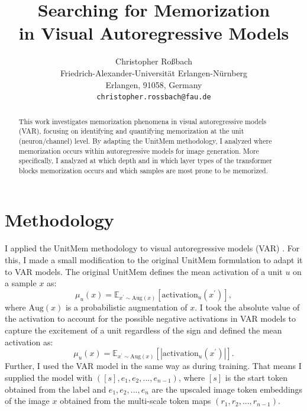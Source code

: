\documentclass{article} %
\title{Searching for Memorization\\in Visual Autoregressive Models}
\author{Christopher Roßbach\\
Friedrich-Alexander-Universität Erlangen-Nürnberg \\
Erlangen, 91058, Germany \\
\texttt{christopher.rossbach@fau.de}}
\begin{document}
\maketitle

\begin{abstract}
This work investigates memorization phenomena in visual autoregressive models (VAR), focusing on identifying and quantifying memorization at the unit (neuron/channel) level.
By adapting the UnitMem methodology, I analyzed where memorization occurs within autoregressive models for image generation.
More specifically, I analyzed at which depth and in which layer types of the transformer blocks memorization occurs and which samples are most prone to be memorized.
\end{abstract}
\section{Methodology}
I applied the UnitMem methodology \citep{wangLocalizingMemorizationSSL2024} to visual autoregressive models (VAR) \citep{tianVisualAutoregressiveModeling2024}.
For this, I made a small modification to the original UnitMem formulation to adapt it to VAR models.
The original UnitMem defines the mean activation of a unit $u$ on a sample $x$ as:
\begin{equation}
    \mu_u(x) = \mathbb{E}_{x^\prime\sim\text{Aug}(x)}[\text{activation}_u(x^\prime)],
\end{equation}
where $\text{Aug}(x)$ is a probabilistic augmentation of $x$.
I took the absolute value of the activation to account for the possible negative activations in VAR models to capture the excitement of a unit regardless of the sign and defined the mean activation as:
\begin{equation}
   \label{eq:activation_mean}
    \mu_u(x) = \mathbb{E}_{x^\prime\sim\text{Aug}(x)}[|\text{activation}_u(x^\prime)|].
\end{equation}
Further, I used the VAR model in the same way as during training.
That means I supplied the model with $([s], e_1, e_2, ..., e_{n-1})$, where $[s]$ is the start token obtained from the label and $e_1, e_2, ..., e_{n}$ are the upscaled image token embeddings of the image $x$ obtained from the multi-scale token maps $(r_1, r_2, ..., r_{n-1})$.
\end{document}
